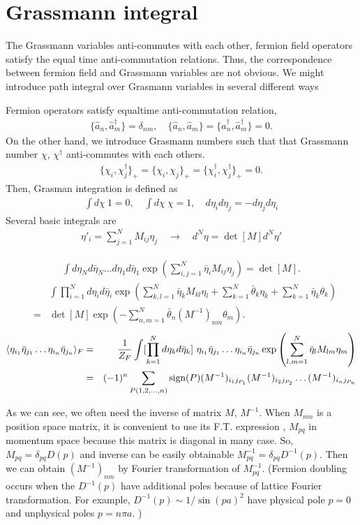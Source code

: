 \documentclass[10pt]{book}
\newcommand{\bea}{\begin{eqnarray}}
\newcommand{\eea}{\end{eqnarray}}
\newcommand{\no}{\nonumber \\}
\def\la{\langle}
\def\ra{\rangle}
\begin{document}
\section{Grassmann integral}
The Grassmann variables anti-commutes with each other,
fermion field operators satisfy the equal time anti-commutation relations.
Thus, the correspondence between fermion field and Grassmann variables
are not obvious. We might introduce path integral over Grasmann variables
in several different ways

Fermion operators satisfy equaltime anti-commutation relation,
\bea
\{\hat{a}_n,\hat{a}^\dagger_m \}=\delta_{nm},
 \quad \{\hat{a}_n,\hat{a}_m\}=\{\hat{a}_n^\dagger,\hat{a}_m^\dagger\}=0. 
\eea
On the other hand, we introduce Grasmann numbers such that
that Grassmann number $\chi$, $\chi^\dagger$ anti-commutes with each others.
\bea
\{ \chi_i,\chi_j^\dagger \}_{+}=\{ \chi_i,\chi_j \}_{+}=
\{ \chi_i^\dagger,\chi_j^\dagger \}_{+}=0.
\eea
Then, Grasman integration is defined as
\bea
\int d\chi\ 1=0,\quad \int d\chi\ \chi =1,\quad d\eta_i d\eta_j=-d\eta_j d\eta_i
\eea
Several basic integrals are
\bea 
\eta'_i=\sum_{j=1}^N M_{ij} \eta_j \quad \to\quad  d^N \eta=\det[M] d^N\eta'
\eea 

\bea 
\int d\eta_N d\bar{\eta}_N\dots d\eta_1 d\bar{\eta}_1 \exp\left(
   \sum_{i,j=1}^N \bar{\eta}_i M_{ij}\eta_j\right) =\det[M].
\eea
\bea 
& &\int \prod_{i=1}^N d\eta_i d\bar{\eta}_i
   \exp\left(\sum_{k,l=1}^N \bar{\eta}_k M_{kl}\eta_l
    +\sum_{k=1}^N \bar{\theta}_k\eta_k+\sum_{k=1}^N \bar{\eta}_k\theta_k\right) \no 
&=&\det[M]\exp\left(-\sum_{n,m=1}^N \bar{\theta}_n(M^{-1})_{nm}\theta_m   \right).   
\eea 
\bea 
\la \eta_{i_1}\bar{\eta}_{j_1}\dots\eta_{i_n}\bar{\eta}_{j_n}\ra_F
&=&\frac{1}{Z_F}\int [\prod_{k=1}^N d\eta_k d\bar{\eta}_k]\ 
  \eta_{i_1}\bar{\eta}_{j_1}\dots\eta_{i_n}\bar{\eta}_{j_n}
  \exp\left(\sum_{l,m=1}^N \bar{\eta}_l M_{lm}\eta_m\right) \no 
&=&(-1)^n\sum_{P(1,2,\dots,n)} {\rm sign}(P)  
 (M^{-1})_{i_1 j_{P_1}}(M^{-1})_{i_2 j_{P_2}}\dots (M^{-1})_{i_n j_{P_n}}
\eea 

As we can see, we often need the inverse of matrix $M$, $M^{-1}$. 
When $M_{nm}$ is a position space matrix, it is convenient to use its 
F.T. expression , $M_{pq}$ in momentum space because this matrix is diagonal 
in many case. So, $M_{pq}=\delta_{pq}D(p)$ and inverse can be easily
obtainable $M^{-1}_{pq}=\delta_{pq}D^{-1}(p)$. Then we can obtain
$(M^{-1})_{nm}$ by Fourier transformation of $M^{-1}_{pq}$.
(Fermion doubling occurs when the $D^{-1}(p)$ have additional poles 
because of lattice Fourier transformation. For example, 
$D^{-1}(p)\sim 1/\sin(pa)^2$ have physical pole $p=0$ and unphysical poles
$p=n\pi a$.   )
\end{document}
